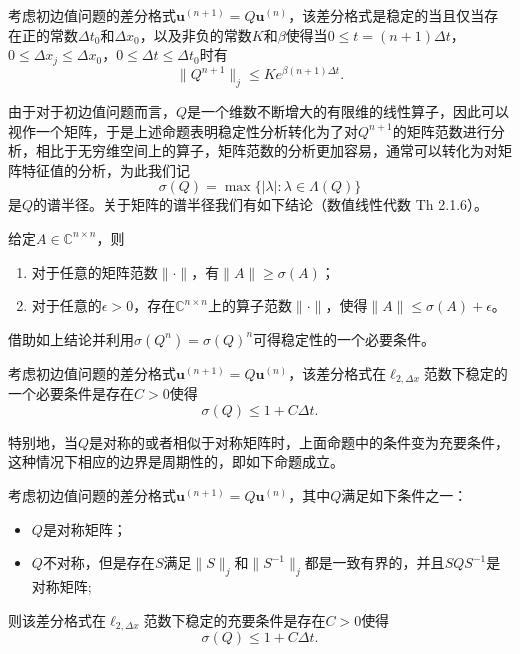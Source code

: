 \documentclass[a4paper,10pt]{ctexart}
\begin{document}
\begin{proposition}
    考虑初边值问题的差分格式$ \bm{u}^{(n+1)} = Q \bm{u}^{(n)} $，该差分格式是稳定的当且仅当存在正的常数$ \Delta t_0 $和$ \Delta x_0 $，以及非负的常数$ K $和$ \beta $使得当$ 0\leqslant t=(n+1)\Delta t $，$ 0\leqslant \Delta x_j\leqslant \Delta x_0 $，$ 0\leqslant \Delta t\leqslant \Delta t_0 $时有
    \begin{equation}
        \| Q^{n+1} \|_j \leqslant K e^{\beta (n+1)\Delta t}.
    \end{equation}
\end{proposition}
由于对于初边值问题而言，$ Q $是一个维数不断增大的有限维的线性算子，因此可以视作一个矩阵，于是上述命题表明稳定性分析转化为了对$ Q^{n+1} $的矩阵范数进行分析，相比于无穷维空间上的算子，矩阵范数的分析更加容易，通常可以转化为对矩阵特征值的分析，为此我们记
\[
    \sigma(Q) = \max\{|\lambda|: \lambda\in \Lambda(Q)\}
\]
是$ Q $的谱半径。关于矩阵的谱半径我们有如下结论（数值线性代数 Th 2.1.6）。
\begin{theorem}
    给定$ A\in \mathbb{C}^{n \times n} $，则
    \begin{enumerate}
        \item 对于任意的矩阵范数$ \| \cdot \| $，有$ \| A \| \geqslant \sigma(A) $；
        \item 对于任意的$ \epsilon>0 $，存在$ \mathbb{C}^{n\times n} $上的算子范数$ \| \cdot \| $，使得$ \| A \| \leqslant \sigma(A) + \epsilon $。
    \end{enumerate}
\end{theorem}
借助如上结论并利用$ \sigma(Q^n) = \sigma(Q)^n $可得稳定性的一个必要条件。
\begin{proposition}
    考虑初边值问题的差分格式$ \bm{u}^{(n+1)} = Q \bm{u}^{(n)} $，该差分格式在$ \ell_{2,\Delta x} $范数下稳定的一个必要条件是存在$ C>0 $使得
    \begin{equation}
        \sigma(Q) \leqslant 1+C\Delta t.
    \end{equation}
\end{proposition}

特别地，当$ Q $是对称的或者相似于对称矩阵时，上面命题中的条件变为充要条件，这种情况下相应的边界是周期性的，即如下命题成立。
\begin{proposition}
    考虑初边值问题的差分格式$ \bm{u}^{(n+1)} = Q \bm{u}^{(n)} $，其中$ Q $满足如下条件之一：
    \begin{itemize}
        \item $ Q $是对称矩阵；
        \item $ Q $不对称，但是存在$ S $满足$ \| S \|_j $和$ \| S^{-1} \|_j $都是一致有界的，并且$ SQS^{-1} $是对称矩阵;
    \end{itemize}
    则该差分格式在$ \ell_{2,\Delta x} $范数下稳定的充要条件是存在$ C>0 $使得
    \[
           \sigma(Q) \leqslant 1+C \Delta t.
    \]
\end{proposition}
\end{document}
